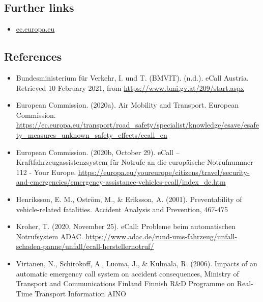 \documentclass[
]{book}
\providecommand{\tightlist}{%
  \setlength{\itemsep}{0pt}\setlength{\parskip}{0pt}}
\begin{document}
\hypertarget{further-links-18}{%
\subsection*{Further links}\label{further-links-18}}

\begin{itemize}
\tightlist
\item
  \href{https://ec.europa.eu/transport/road_safety/specialist/knowledge/esave/esafety_measures_unknown_safety_effects/ecall_en}{ec.europa.eu}
\end{itemize}

\hypertarget{references-21}{%
\subsection*{References}\label{references-21}}

\begin{itemize}
\tightlist
\item
  Bundesministerium für Verkehr, I. und T. (BMVIT). (n.d.). eCall Austria. Retrieved 10 February 2021, from \url{https://www.bmi.gv.at/209/start.aspx}
\item
  European Commission. (2020a). Air \textbar{} Mobility and Transport. European Commission. \url{https://ec.europa.eu/transport/road_safety/specialist/knowledge/esave/esafety_measures_unknown_safety_effects/ecall_en}
\item
  European Commission. (2020b, October 29). eCall -- Kraftfahrzeugassistenzsystem für Notrufe an die europäische Notrufnummer 112 - Your Europe. \url{https://europa.eu/youreurope/citizens/travel/security-and-emergencies/emergency-assistance-vehicles-ecall/index_de.htm}
\item
  Henriksson, E. M., Oström, M., \& Eriksson, A. (2001). Preventability of vehicle-related fatalities. Accident Analysis and Prevention, 467-475
\item
  Kroher, T. (2020, November 25). eCall: Probleme beim automatischen Notrufsystem \textbar{} ADAC. \url{https://www.adac.de/rund-ums-fahrzeug/unfall-schaden-panne/unfall/ecall-herstellernotruf/}
\item
  Virtanen, N., Schirokoff, A., Luoma, J., \& Kulmala, R. (2006). Impacts of an automatic emergency call system on accident consequences, Ministry of Transport and Communications Finland Finnish R\&D Programme on Real-Time Transport Information AINO
\end{itemize}
\end{document}
